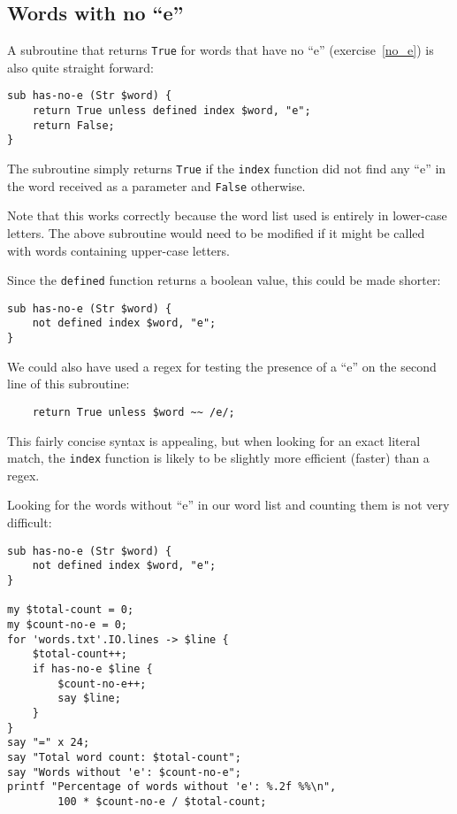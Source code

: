 \subsection{Words with no ``e''}

A subroutine that returns {\tt True} for words that have 
no ``e'' (exercise~\ref{no_e}) is also quite straight forward:

\begin{verbatim}
sub has-no-e (Str $word) {
    return True unless defined index $word, "e";
    return False;
}
\end{verbatim}
%

The subroutine simply returns {\tt True} if the {\tt index} 
function did not find any ``e'' in the word received as 
a parameter and {\tt False} otherwise. 

Note that this works correctly because the word list used 
is entirely in lower-case letters. The above subroutine 
would need to be modified if it might be called with words 
containing upper-case letters. 

Since the {\tt defined} function returns a boolean value, this 
could be made shorter:
\begin{verbatim}
sub has-no-e (Str $word) {
    not defined index $word, "e";
}
\end{verbatim}
%

We could also have used a regex for testing the presence of a 
``e'' on the second line of this subroutine:

\begin{verbatim}
    return True unless $word ~~ /e/;
\end{verbatim}
%

This fairly concise syntax is appealing, but when 
looking for an exact literal match, the {\tt index} function 
is likely to be slightly more efficient (faster) than a 
regex.

Looking for the words without ``e'' in our word list and 
counting them is not very difficult:

\begin{verbatim}
sub has-no-e (Str $word) {
    not defined index $word, "e";
}

my $total-count = 0;
my $count-no-e = 0;
for 'words.txt'.IO.lines -> $line { 
    $total-count++;
    if has-no-e $line {
        $count-no-e++;
        say $line;
    }
}
say "=" x 24;
say "Total word count: $total-count";
say "Words without 'e': $count-no-e";
printf "Percentage of words without 'e': %.2f %%\n", 
        100 * $count-no-e / $total-count;
\end{verbatim}

